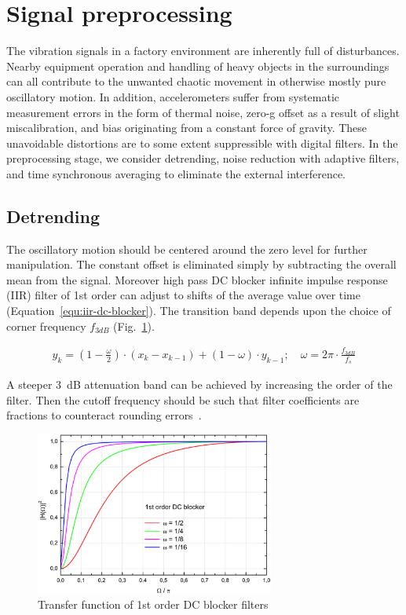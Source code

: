 \section{Signal preprocessing} \label{section:signal-preprocessing}
The vibration signals in a factory environment are inherently full of disturbances. Nearby equipment operation and handling of heavy objects in the surroundings can all contribute to the unwanted chaotic movement in otherwise mostly pure oscillatory motion. In addition, accelerometers suffer from systematic measurement errors in the form of thermal noise, zero-g offset as a result of slight miscalibration, and bias originating from a constant force of gravity. These unavoidable distortions are to some extent suppressible with digital filters. In the preprocessing stage, we consider detrending, noise reduction with adaptive filters, and time synchronous averaging to eliminate the external interference.

\subsection{Detrending}
The oscillatory motion should be centered around the zero level for further manipulation. The constant offset is eliminated simply by subtracting the overall mean from the signal. Moreover high pass DC blocker infinite impulse response (IIR) filter of 1st order can adjust to shifts of the average value over time (Equation~\ref{equ:iir-dc-blocker}). The transition band depends upon the choice of corner frequency $f_{3dB}$ (Fig.~\ref{fig:dc-blocker}).

\begin{ceqn}\begin{align} \label{equ:iir-dc-blocker}
y_k = (1 - \frac{\omega}{2}) \cdot (x_k  -  x_{k - 1}) + (1 - \omega) \cdot y_{k - 1}; \quad \omega = 2\pi \cdot \frac{f_{3dB}}{f_s}
\end{align}\end{ceqn}

A steeper 3~dB attenuation band can be achieved by increasing the order of the filter. Then the cutoff frequency should be such that filter coefficients are fractions to counteract rounding errors~\cite{tittelbach-helmrich_digital_2021}.

\begin{figure}[h]
	\centering
	\includegraphics[width=0.7\textwidth]{assets/analysis/iir-1-dc-blocker-band.jpg}
	\caption{Transfer function of 1st order DC blocker filters ~\cite{tittelbach-helmrich_digital_2021}}
	\label{fig:dc-blocker}
\end{figure}

